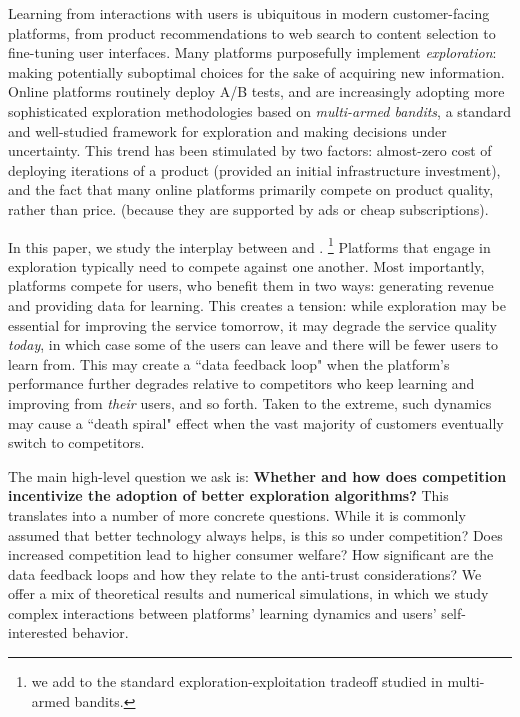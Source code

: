 
Learning from interactions with users is ubiquitous in modern customer-facing platforms, from product recommendations to web search to content selection to fine-tuning user interfaces. Many platforms purposefully implement \emph{exploration}: making potentially suboptimal choices for the sake of acquiring new information. Online platforms routinely deploy A/B tests, and are increasingly adopting  more sophisticated exploration methodologies based on \emph{multi-armed bandits}, a standard and well-studied framework for exploration and making decisions under uncertainty. This trend has been stimulated by two factors: almost-zero cost of deploying iterations of a product (provided an initial infrastructure investment), and the fact that many online platforms primarily compete on product quality, rather than price.
(\eg because they are supported by ads or cheap subscriptions).


In this paper, we study the interplay between \exploration and \competition.%
\footnote{\Ie we add \competition to the standard exploration-exploitation tradeoff studied in multi-armed bandits.}
Platforms that engage in exploration typically need to compete against one another. Most importantly, platforms compete for users, who benefit them in two ways:
generating revenue and providing data for learning. This creates a tension:
while exploration may be essential for improving the service tomorrow, it may degrade the service quality \emph{today}, in which case some of the users can leave and there will be fewer users to learn from. This may create a ``data feedback loop" when the platform's performance further degrades relative to competitors who keep learning and improving from \emph{their} users, and so forth. Taken to the extreme, such dynamics may cause a ``death spiral" effect when the vast majority of customers eventually switch to competitors.


The main high-level question we ask is:
\textbf{Whether and how does competition incentivize the adoption of better exploration algorithms?}
This translates into a number of more concrete questions. While it is commonly assumed that better technology always helps, is this so under competition? Does increased competition lead to higher consumer welfare? How significant are the data feedback loops
and how they relate to the anti-trust considerations?
We offer a mix of theoretical results and numerical simulations, in which we study complex interactions between platforms' learning dynamics and users' self-interested behavior.

